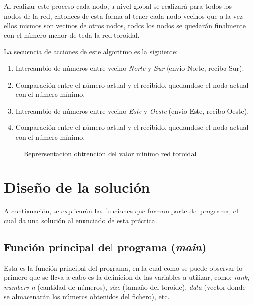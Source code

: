 \documentclass[11pt]{article}
\begin{document}
Al realizar este proceso cada nodo, a nivel global se realizará para todos los nodos de la red, entonces de esta forma al tener cada nodo vecinos que a la vez ellos mismos son vecinos de otros nodos, todos los nodos se quedarán finalmente con el número menor de toda la red toroidal.

La secuencia de acciones de este algoritmo es la siguiente:
\begin{enumerate}
	\item Intercambio de números entre vecino \textit{Norte} y \textit{Sur} (envio Norte, recibo Sur).
	\item Comparación entre el número actual y el recibido, quedandose el nodo actual con el número mínimo.
	\item Intercambio de números entre vecino \textit{Este} y \textit{Oeste} (envio Este, recibo Oeste).
	\item Comparación entre el número actual y el recibido, quedandose el nodo actual con el número mínimo.
\end{enumerate}

\begin{figure}[H]
  \centering
  \caption{Reprersentación obtrención del valor mínimo red toroidal}
  \label{fig:toroide}
\end{figure}

\clearpage

\section{Diseño de la solución}
A continuación, se explicarán las funciones que forman parte del programa, el cual da una solución al enunciado de esta práctica.
\\

\subsection{Función principal del programa (\textit{main})}
Esta es la función principal del programa, en la cual como se puede observar lo primero que se lleva a cabo es la definicion de las variables a utilizar, como: \textit{rank}, \textit{numbers-n} (cantidad de números), \textit{size} (tamaño del toroide), \textit{data} (vector donde se almacenarán los números obtenidos del fichero), etc.
\end{document}
